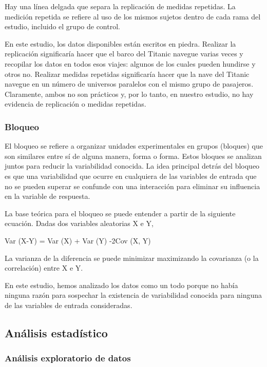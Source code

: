 \documentclass[]{article}
\begin{document}
Hay una línea delgada que separa la replicación de medidas repetidas. La
medición repetida se refiere al uso de los mismos sujetos dentro de cada
rama del estudio, incluido el grupo de control.

En este estudio, los datos disponibles están escritos en piedra.
Realizar la replicación significaría hacer que el barco del Titanic
navegue varias veces y recopilar los datos en todos esos viajes: algunos
de los cuales pueden hundirse y otros no. Realizar medidas repetidas
significaría hacer que la nave del Titanic navegue en un número de
universos paralelos con el mismo grupo de pasajeros. Claramente, ambos
no son prácticos y, por lo tanto, en nuestro estudio, no hay evidencia
de replicación o medidas repetidas.

\subsubsection{Bloqueo}\label{bloqueo}

El bloqueo se refiere a organizar unidades experimentales en grupos
(bloques) que son similares entre sí de alguna manera, forma o forma.
Estos bloques se analizan juntos para reducir la variabilidad conocida.
La idea principal detrás del bloqueo es que una variabilidad que ocurre
en cualquiera de las variables de entrada que no se pueden superar se
confunde con una interacción para eliminar su influencia en la variable
de respuesta.

La base teórica para el bloqueo se puede entender a partir de la
siguiente ecuación. Dadas dos variables aleatorias X e Y,

Var (X-Y) = Var (X) + Var (Y) -2Cov (X, Y)

La varianza de la diferencia se puede minimizar maximizando la
covarianza (o la correlación) entre X e Y.

En este estudio, hemos analizado los datos como un todo porque no había
ninguna razón para sospechar la existencia de variabilidad conocida para
ninguna de las variables de entrada consideradas.

\subsection{Análisis estadístico}\label{analisis-estadistico}

\subsubsection{Análisis exploratorio de
datos}\label{analisis-exploratorio-de-datos}
\end{document}
